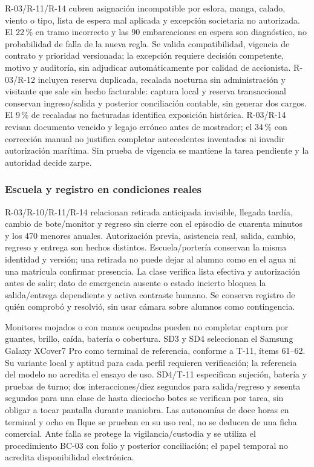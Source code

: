 R-03/R-11/R-14 cubren asignación incompatible por eslora, manga, calado, viento o tipo, lista de espera mal aplicada y excepción societaria no autorizada. El 22\,\% en tramo incorrecto y las 90 embarcaciones en espera son diagnóstico, no probabilidad de falla de la nueva regla. Se valida compatibilidad, vigencia de contrato y prioridad versionada; la excepción requiere decisión competente, motivo y auditoría, sin adjudicar automáticamente por calidad de accionista. R-03/R-12 incluyen reserva duplicada, recalada nocturna sin administración y visitante que sale sin hecho facturable: captura local y reserva transaccional conservan ingreso/salida y posterior conciliación contable, sin generar dos cargos. El 9\,\% de recaladas no facturadas identifica exposición histórica. R-03/R-14 revisan documento vencido y legajo erróneo antes de mostrador; el 34\,\% con corrección manual no justifica completar antecedentes inventados ni invadir autorización marítima. Sin prueba de vigencia se mantiene la tarea pendiente y la autoridad decide zarpe.

\subsubsection{Escuela y registro en condiciones reales}
R-03/R-10/R-11/R-14 relacionan retirada anticipada invisible, llegada tardía, cambio de bote/monitor y regreso sin cierre con el episodio de cuarenta minutos y los 470 menores anuales. Autorización previa, asistencia real, salida, cambio, regreso y entrega son hechos distintos. Escuela/portería conservan la misma identidad y versión; una retirada no puede dejar al alumno como en el agua ni una matrícula confirmar presencia. La clase verifica lista efectiva y autorización antes de salir; dato de emergencia ausente o estado incierto bloquea la salida/entrega dependiente y activa contraste humano. Se conserva registro de quién comprobó y resolvió, sin usar cámara sobre alumnos como contingencia.

Monitores mojados o con manos ocupadas pueden no completar captura por guantes, brillo, caída, batería o cobertura. SD3 y SD4 seleccionan el Samsung Galaxy XCover7 Pro como terminal de referencia, conforme a T-11, ítems 61--62. Su variante local y aptitud para cada perfil requieren verificación; la referencia del modelo no acredita el ensayo de uso. SD4/T-11 especifican sujeción, batería y pruebas de turno; dos interacciones/diez segundos para salida/regreso y sesenta segundos para una clase de hasta dieciocho botes se verifican por tarea, sin obligar a tocar pantalla durante maniobra. Las autonomías de doce horas en terminal y ocho en Ilque se prueban en su uso real, no se deducen de una ficha comercial. Ante falla se protege la vigilancia/custodia y se utiliza el procedimiento BC-03 con folio y posterior conciliación; el papel temporal no acredita disponibilidad electrónica.

